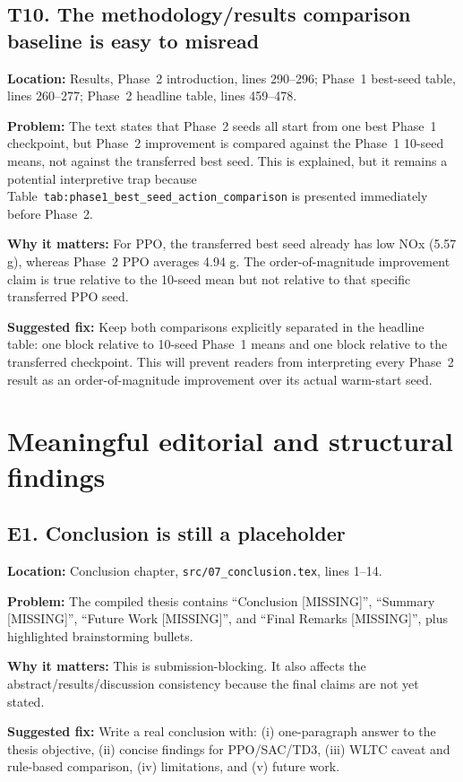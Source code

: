 \documentclass[11pt,a4paper]{article}
\newcommand{\loc}[1]{\textbf{Location:} #1\par}
\newcommand{\problem}{\textbf{Problem:} }
\newcommand{\why}{\textbf{Why it matters:} }
\newcommand{\fix}{\textbf{Suggested fix:} }
\begin{document}
\subsection*{T10. The methodology/results comparison baseline is easy to misread}

\loc{Results, Phase~2 introduction, lines 290--296; Phase~1 best-seed table, lines 260--277; Phase~2 headline table, lines 459--478.}
\problem The text states that Phase~2 seeds all start from one best Phase~1 checkpoint, but Phase~2 improvement is compared against the Phase~1 10-seed means, not against the transferred best seed. This is explained, but it remains a potential interpretive trap because Table~\texttt{tab:phase1\_best\_seed\_action\_comparison} is presented immediately before Phase~2.

\why For PPO, the transferred best seed already has low NOx (5.57 g), whereas Phase~2 PPO averages 4.94 g. The order-of-magnitude improvement claim is true relative to the 10-seed mean but not relative to that specific transferred PPO seed.

\fix Keep both comparisons explicitly separated in the headline table: one block relative to 10-seed Phase~1 means and one block relative to the transferred checkpoint. This will prevent readers from interpreting every Phase~2 result as an order-of-magnitude improvement over its actual warm-start seed.

\section*{Meaningful editorial and structural findings}

\subsection*{E1. Conclusion is still a placeholder}

\loc{Conclusion chapter, \texttt{src/07\_conclusion.tex}, lines 1--14.}
\problem The compiled thesis contains ``Conclusion [MISSING]'', ``Summary [MISSING]'', ``Future Work [MISSING]'', and ``Final Remarks [MISSING]'', plus highlighted brainstorming bullets.

\why This is submission-blocking. It also affects the abstract/results/discussion consistency because the final claims are not yet stated.

\fix Write a real conclusion with: (i) one-paragraph answer to the thesis objective, (ii) concise findings for PPO/SAC/TD3, (iii) WLTC caveat and rule-based comparison, (iv) limitations, and (v) future work.
\end{document}
